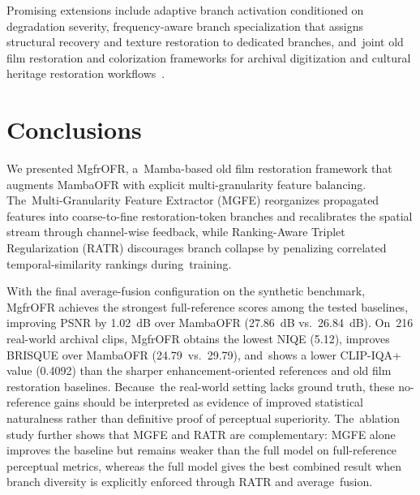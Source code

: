\documentclass[symmetry,article,accept,pdftex,moreauthors]{Definitions/mdpi}
\begin{document}
Promising extensions include adaptive branch activation conditioned on degradation severity, frequency-aware branch specialization that assigns structural recovery and texture restoration to dedicated branches, and~joint old film restoration and colorization frameworks for archival digitization and cultural heritage restoration workflows~\cite{kokaram2004missing}.

%
\section{Conclusions}
\label{sec:conclusion}

We presented MgfrOFR, a~Mamba-based old film restoration framework that augments MambaOFR with explicit multi-granularity feature balancing. The~Multi-Granularity Feature Extractor (MGFE) reorganizes propagated features into coarse-to-fine restoration-token branches and recalibrates the spatial stream through channel-wise feedback, while Ranking-Aware Triplet Regularization (RATR) discourages branch collapse by penalizing correlated temporal-similarity rankings during~training.

With the final average-fusion configuration on the synthetic benchmark, MgfrOFR achieves the strongest full-reference scores among the tested baselines, improving PSNR by 1.02~dB over MambaOFR (27.86~dB vs.\ 26.84~dB). On~216 real-world archival clips, MgfrOFR obtains the lowest NIQE (5.12), improves BRISQUE over MambaOFR \mbox{(24.79 vs.\ 29.79)}, and~shows a lower CLIP-IQA+ value (0.4092) than the sharper enhancement-oriented references and old film restoration baselines. Because~the real-world setting lacks ground truth, these no-reference gains should be interpreted as evidence of improved statistical naturalness rather than definitive proof of perceptual superiority. The~ablation study further shows that MGFE and RATR are complementary: MGFE alone improves the baseline but remains weaker than the full model on full-reference perceptual metrics, whereas the full model gives the best combined result when branch diversity is explicitly enforced through RATR and average~fusion.
\end{document}
